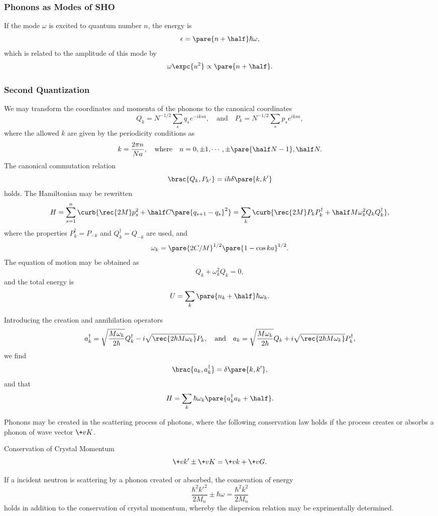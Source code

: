 \documentclass[hidelinks]{article}
\begin{document}
\subsubsection{Phonons as Modes of SHO} %
\label{ssub:phonons_as_modes_of_sho}

If the mode $\omega$ is excited to quantum number $n$, the energy is
\[ \epsilon = \pare{n+\half}\hbar \omega, \]
which is related to the amplitude of this mode by
\[ \omega \expc{u^2} \propto \pare{n+\half}. \]


\subsubsection{Second Quantization} %
\label{ssub:second_quantization}

We may transform the coordinates and momenta of the phonons to the canonical coordinates
\[ Q_k = N^{-1/2} \sum_s q_s e^{-iksa},\quad \text{and}\quad P_k = N^{-1/2}\sum_s p_s e^{iksa}, \]
where the allowed $k$ are given by the periodicity conditions as
\[ k = \frac{2\pi n}{Na},\quad \text{where}\quad n = 0,\pm 1,\cdots,\pm \pare{\half N - 1}, \half N. \]
The canonical commutation relation
\[ \brac{Q_k, P_{k'}} = i\hbar \delta\pare{k,k'} \]
holds. The Hamiltonian may be rewritten
\[ H = \sum_{s=1}^n \curb{\rec{2M}p_s^2 + \half C\pare{q_{s+1} - q_s}^2} = \sum_k \curb{\rec{2M}P_{k}P^\dagger_k + \half M\omega_k^2 Q_{k}Q^\dagger_k}, \]
where the properties $P^\dagger_k = P_{-k}$ and $Q^\dagger_k = Q_{-k}$ are used, and 
\[ \omega_k = \pare{2C/M}^{1/2} \pare{1-\cos ka}^{1/2}. \]
The equation of motion may be obtained as
\[ \ddot{Q}_k + \omega_k^2 Q_k = 0, \]
and the total energy is
\[ U = \sum_k \pare{n_k + \half}\hbar\omega_k. \]
\par
Introducing the creation and annihilation operators
\[ a^\dagger_k = \sqrt{\frac{M\omega_k}{2\hbar}}Q^\dagger_k - i\sqrt{\rec{2\hbar M\omega_k}}P_k,\quad \text{and}\quad a_k = \sqrt{\frac{M\omega_k}{2\hbar}}Q_k + i\sqrt{\rec{2\hbar M\omega_k}}P_k^\dagger, \]
we find
\[ \brac{a_k,a^\dagger_k} = \delta\pare{k,k'}, \]
and that
\[ H = \sum_k \hbar\omega_k\pare{a^\dagger_k a_k + \half}. \]


\label{ssub:phonon_momentum}

Phonons may be created in the scattering process of photons, where the following conservation law holds if the process creates or absorbs a phonon of wave vector $\+vK$.
\begin{finaleq}{Conservation of Crystal Momentum}
    \[ \+vk' \pm \+vK = \+vk + \+vG. \]
\end{finaleq}
\par
If a incident neutron is scattering by a phonon created or absorbed, the consevation of energy
\[ \frac{\hbar^2 k'^2}{2M_n} \pm \hbar\omega = \frac{\hbar^2 k^2}{2M_n} \]
holds in addition to the conservation of crystal momentum, whereby the dispersion relation may be exprimentally determined.
\end{document}
